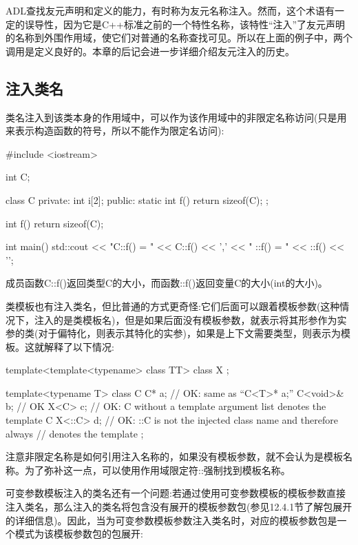 ADL查找友元声明和定义的能力，有时称为友元名称注入。然而，这个术语有一定的误导性，因为它是C++标准之前的一个特性名称，该特性“注入”了友元声明的名称到外围作用域，使它们对普通的名称查找可见。所以在上面的例子中，两个调用是定义良好的。本章的后记会进一步详细介绍友元注入的历史。

\subsection{注入类名}

类名注入到该类本身的作用域中，可以作为该作用域中的非限定名称访问(只是用来表示构造函数的符号，所以不能作为限定名访问):

\begin{cpp}
#include <iostream>

int C;

class C {
private:
	int i[2];
public:
	static int f() {
		return sizeof(C);
	}
};

int f()
{
	return sizeof(C);
}

int main()
{
	std::cout << "C::f() = " << C::f() << ’,’
	<< " ::f() = " << ::f() << ’\n’;
}
\end{cpp}

成员函数C::f()返回类型C的大小，而函数::f()返回变量C的大小(int的大小)。

类模板也有注入类名，但比普通的方式更奇怪:它们后面可以跟着模板参数(这种情况下，注入的是类模板名)，但是如果后面没有模板参数，就表示将其形参作为实参的类(对于偏特化，则表示其特化的实参)，如果是上下文需要类型，则表示为模板。这就解释了以下情况:

\begin{cpp}
template<template<typename> class TT> class X {
};

template<typename T> class C {
	C* a; // OK: same as “C<T>* a;”
	C<void>& b; // OK
	X<C> c; // OK: C without a template argument list denotes the template C
	X<::C> d; // OK: ::C is not the injected class name and therefore always
			  // denotes the template
};
\end{cpp}

注意非限定名称是如何引用注入名称的，如果没有模板参数，就不会认为是模板名称。为了弥补这一点，可以使用作用域限定符::强制找到模板名称。

可变参数模板注入的类名还有一个问题:若通过使用可变参数模板的模板参数直接注入类名，那么注入的类名将包含没有展开的模板参数包(参见12.4.1节了解包展开的详细信息)。因此，当为可变参数模板参数注入类名时，对应的模板参数包是一个模式为该模板参数包的包展开:

